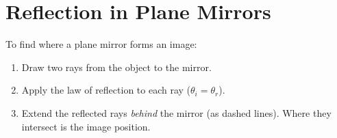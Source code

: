 \section{Reflection in Plane Mirrors}

\begin{processbox}
To find where a plane mirror forms an image:
\begin{enumerate}[noitemsep]
  \item Draw two rays from the object to the mirror.
  \item Apply the law of reflection to each ray
  ($\theta_i = \theta_r$).
  \item Extend the reflected rays \textit{behind} the
  mirror (as dashed lines). Where they intersect is
  the image position.
\end{enumerate}
\end{processbox}

